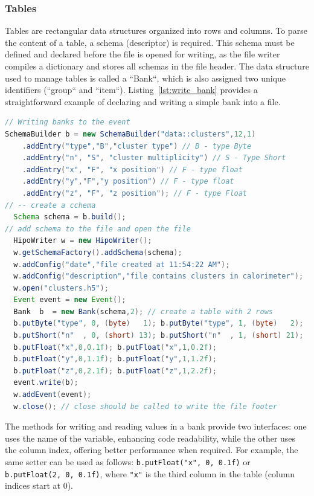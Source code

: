 \documentclass[preprint,12pt]{elsarticle}
\begin{document}
\subsubsection{Tables}

Tables are rectangular data structures organized into rows and columns. To parse the content of a table, a schema (descriptor) is required. This schema must be defined and declared before the file is opened for writing, as the file writer compiles a dictionary and stores all schemas in the file header. The data structure used to manage tables is called a ``Bank``, which is also assigned two unique identifiers (``group`` and ``item``). Listing~\ref{lst:write_bank} provides a straightforward example of declaring and writing a simple bank into a file.

\begin{lstlisting}[language=java, caption=Java example to create and write banks (tables) into an event, label=lst:write_bank]
// Writing banks to the event
SchemaBuilder b = new SchemaBuilder("data::clusters",12,1)
    .addEntry("type","B","cluster type") // B - type Byte
    .addEntry("n", "S", "cluster multiplicity") // S - Type Short
    .addEntry("x", "F", "x position") // F - type float
    .addEntry("y","F","y position") // F - type float
    .addEntry("z", "F", "z position"); // F - type Float
// -- create a cchema
  Schema schema = b.build();
// add schema to the file and open the file
  HipoWriter w = new HipoWriter();
  w.getSchemaFactory().addSchema(schema);
  w.addConfig("date","file created at 11:54:22 AM");
  w.addConfig("description","file contains clusters in calorimeter");
  w.open("clusters.h5");                
  Event event = new Event();
  Bank  b  = new Bank(schema,2); // create a table with 2 rows
  b.putByte("type", 0, (byte)   1); b.putByte("type", 1, (byte)   2);
  b.putShort("n"  , 0, (short) 13); b.putShort("n"  , 1, (short) 21);
  b.putFloat("x",0,0.1f); b.putFloat("x",1,0.2f);
  b.putFloat("y",0,1.1f); b.putFloat("y",1,1.2f);
  b.putFloat("z",0,2.1f); b.putFloat("z",1,2.2f);
  event.write(b);
  w.addEvent(event);
  w.close(); // close should be called to write the file footer
\end{lstlisting}

The methods for writing and reading values in a bank provide two interfaces: one uses the name of the variable, enhancing code readability, while the other uses the column index, offering better performance when required. For example, the same setter can be used as follows: { \tt b.putFloat("x", 0, 0.1f)} or {\tt b.putFloat(2, 0, 0.1f)}, where {\tt "x"} is the third column in the table (column indices start at 0). 
\end{document}
